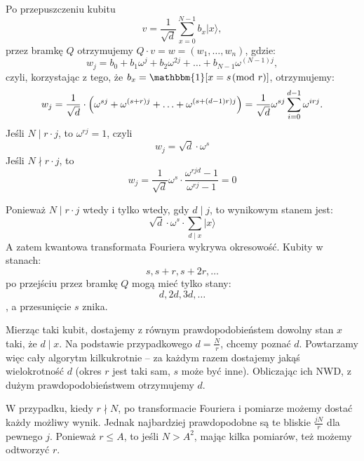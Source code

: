 Po przepuszczeniu kubitu
\[
    v = \frac{1}{\sqrt{d}} \sum_{x=0}^{N-1} b_x |x\rangle,
\]
przez bramkę \( Q \) otrzymujemy \( Q \cdot v = w = (w_1, \ldots, w_n) \), gdzie:
\[
    w_j = b_0 + b_1 \omega^j + b_2 \omega^{2j} + \ldots + b_{N-1} \omega^{(N-1)j},
\]
czyli, korzystając z tego, że \( b_x = \mathbbm{1}[x = s \!\!\pmod{r}] \), otrzymujemy:
\[
    w_j = \frac{1}{\sqrt{d}} \cdot \left( \omega^{s j} + \omega^{(s + r) j} + \ldots + \omega^{(s + (d - 1)r) j} \right) = \frac{1}{\sqrt{d}} \omega^{s j} \sum_{i = 0}^{d - 1} \omega^{i r j}.
\]
Jeśli \( N \mid r \cdot j \), to \( \omega^{r j} = 1 \), czyli
\[
    w_j = \sqrt{d} \cdot \omega^{s}
\]
Jeśli \( N \nmid r \cdot j \), to
\[
    w_j = \frac{1}{\sqrt{d}} \omega^{s} \cdot \frac{\omega^{r j d} - 1}{\omega^{r j} - 1} = 0
\]

Ponieważ \( N \mid r \cdot j \) wtedy i tylko wtedy, gdy \( d \mid j \), to wynikowym stanem jest:
\[
    \sqrt{d} \cdot \omega^s \cdot \sum_{d \mid x} |x\rangle
\]
A zatem kwantowa transformata Fouriera wykrywa okresowość.
Kubity w stanach: \[ s, s + r, s + 2r, \ldots \] po przejściu przez bramkę \( Q \) mogą mieć tylko stany: \[ d, 2d, 3d, \ldots \], a przesunięcie \( s \) znika.

Mierząc taki kubit, dostajemy z równym prawdopodobieństem dowolny stan \( x \) taki, że \( d \mid x \). Na podstawie przypadkowego \( d = \frac{N}{r} \), chcemy poznać \( d \).
Powtarzamy więc cały algorytm kilkukrotnie -- za każdym razem dostajemy jakąś wielokrotność \( d \) (okres \( r \) jest taki sam, \( s \) może być inne).
Obliczając ich NWD, z dużym prawdopodobieństwem otrzymujemy \( d \).

W przypadku, kiedy \( r \nmid N \), po transformacie Fouriera i pomiarze możemy dostać każdy możliwy wynik. Jednak najbardziej prawdopodobne są te bliskie \( \frac{jN}{r} \) dla pewnego \( j \).
Ponieważ \( r \leq A \), to jeśli \( N > A^2 \), mając kilka pomiarów, też możemy odtworzyć \( r \).